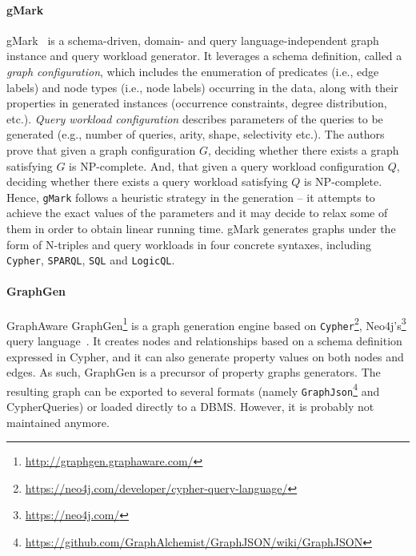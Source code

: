 \paragraph{gMark}  gMark~\cite{gMark} is a schema-driven, domain- and query language-independent graph instance and query workload generator.  It leverages a schema definition,
called a \emph{graph configuration}, which includes the enumeration of predicates (i.e., edge labels) and node types (i.e., node labels) occurring in the data, along with their properties in generated instances (occurrence constraints, degree distribution, etc.). \emph{Query workload configuration}  describes parameters of the queries to be generated (e.g., number of queries, arity, shape, selectivity etc.). The authors prove that given a graph configuration $G$, deciding whether there exists a graph satisfying $G$ is NP-complete. And, that given a query workload configuration $Q$, deciding
whether there exists a query workload satisfying $Q$ is NP-complete. Hence, \texttt{gMark} follows a heuristic strategy in the generation -- it attempts to achieve the exact values of the parameters and it may decide to relax some of them in order to obtain linear running time. gMark generates graphs under the form of N-triples and query workloads in four concrete syntaxes, including \texttt{Cypher}, \texttt{SPARQL}, \texttt{SQL} and \texttt{LogicQL}.

\paragraph{GraphGen}  GraphAware GraphGen\footnote{\url{http://graphgen.graphaware.com/}} is a graph generation engine based on \texttt{Cypher}\footnote{\url{https://neo4j.com/developer/cypher-query-language/}}, Neo4j's\footnote{\url{https://neo4j.com/}} query language~\cite{GraphGen}.  It creates nodes and relationships based on a schema definition expressed in Cypher, and it can also generate property values on both
nodes and edges. As such, GraphGen is a precursor of property graphs generators. The resulting graph can be exported to several formats (namely \texttt{GraphJson}\footnote{\url{https://github.com/GraphAlchemist/GraphJSON/wiki/GraphJSON}} and CypherQueries) or loaded directly to a DBMS. However, it is probably not maintained anymore. 